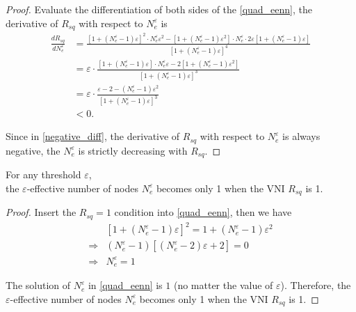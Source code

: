 \begin{proof}
        
    Evaluate the differentiation of both sides of the \eqref{quad_eenn},
    the derivative of $R_{sq}$ with respect to $N_e^\varepsilon$ is
    \begin{equation}
        \begin{aligned}
        \frac{dR_{sq}}{dN_e^\varepsilon}&=
        \frac{[1+(N_e^\varepsilon-1)\varepsilon]^2\cdot N_e^\varepsilon\varepsilon^2
        -[1+(N_e^\varepsilon-1)\varepsilon^2]\cdot N_e^\varepsilon \cdot 2\varepsilon[1+(N_e^\varepsilon-1)\varepsilon]}
        {[1+(N_e^\varepsilon-1)\varepsilon]^4}\\
        &=\varepsilon\cdot
        \frac{[1+(N_e^\varepsilon-1)\varepsilon]\cdot N_e^\varepsilon\varepsilon
        -2[1+(N_e^\varepsilon-1)\varepsilon^2]}
        {[1+(N_e^\varepsilon-1)\varepsilon]^3}\\
        &=\varepsilon\cdot
        \frac{\varepsilon-2-(N_e^\varepsilon-1)\varepsilon^2}
        {[1+(N_e^\varepsilon-1)\varepsilon]^3}\\
        &<0.
        \end{aligned}
        \label{negative_diff}
    \end{equation}

    Since in \eqref{negative_diff}, the derivative of $R_{sq}$ with respect to $N_e^\varepsilon$
    is always negative,
    the $N_e^\varepsilon$ is strictly decreasing with $R_{sq}$.

\end{proof}


\begin{theorem}
    \label{collapse}
    For any threshold $\varepsilon$,
    \\the $\varepsilon$-effective number of nodes $N_e^\varepsilon$ becomes only 1
    when the VNI $R_{sq}$ is 1.
\end{theorem}

\begin{proof}
    Insert the $R_{sq}=1$ condition into \eqref{quad_eenn}, then we have
    \begin{equation}
        \begin{aligned}
            &[1+(N_e^\varepsilon-1)\varepsilon]^2=1+(N_e^\varepsilon-1)\varepsilon^2\\
            \Rightarrow&(N_e^\varepsilon-1)[(N_e^\varepsilon-2)\varepsilon+2]=0\\
            \Rightarrow& N_e^\varepsilon=1
        \end{aligned}
        \label{collapse_eqn}
    \end{equation}

    The solution of $N_e^\varepsilon$ in \eqref{quad_eenn} is $1$ 
    (no matter the value of $\varepsilon$).
    Therefore, the $\varepsilon$-effective number of nodes $N_e^\varepsilon$ becomes only 1
    when the VNI $R_{sq}$ is 1.
\end{proof}

